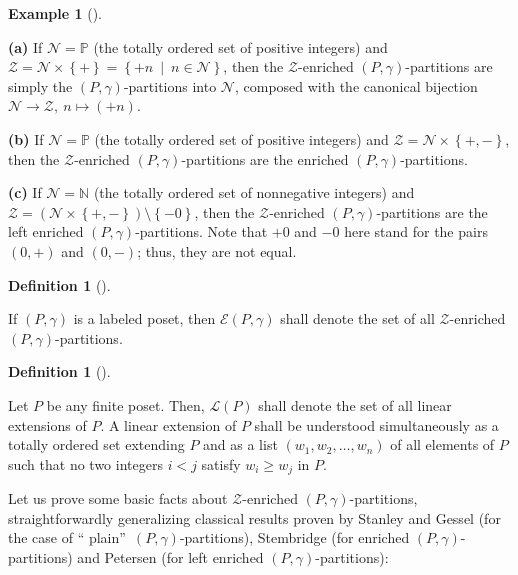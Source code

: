 \documentclass[numbers=enddot,12pt,final,onecolumn,notitlepage]{scrartcl}%
\theoremstyle{definition}
\newtheorem{defi}[theo]{Definition}
\newenvironment{definition}[1][]
{\begin{defi}[#1]\begin{leftbar}}
{\end{leftbar}\end{defi}}
\newtheorem{exmp}[theo]{Example}
\newenvironment{example}[1][]
{\begin{exmp}[#1]\begin{leftbar}}
{\end{leftbar}\end{exmp}}
\begin{document}
\begin{example}
\label{exa.ambivPp.abc}\textbf{(a)} If $\mathcal{N}=\mathbb{P}$ (the totally
ordered set of positive integers) and $\mathcal{Z}=\mathcal{N}\times\left\{
+\right\}  =\left\{  +n\ \mid\ n\in\mathcal{N}\right\}  $, then the
$\mathcal{Z}$-enriched $\left(  P,\gamma\right)  $-partitions are simply the
$\left(  P,\gamma\right)  $-partitions into $\mathcal{N}$, composed with the
canonical bijection $\mathcal{N}\rightarrow\mathcal{Z},\ n\mapsto\left(
+n\right)  $.

\textbf{(b)} If $\mathcal{N}=\mathbb{P}$ (the totally ordered set of positive
integers) and $\mathcal{Z}=\mathcal{N}\times\left\{  +,-\right\}  $, then the
$\mathcal{Z}$-enriched $\left(  P,\gamma\right)  $-partitions are the enriched
$\left(  P,\gamma\right)  $-partitions.

\textbf{(c)} If $\mathcal{N}=\mathbb{N}$ (the totally ordered set of
nonnegative integers) and $\mathcal{Z}=\left(  \mathcal{N}\times\left\{
+,-\right\}  \right)  \setminus\left\{  -0\right\}  $, then the $\mathcal{Z}%
$-enriched $\left(  P,\gamma\right)  $-partitions are the left enriched
$\left(  P,\gamma\right)  $-partitions. Note that $+0$ and $-0$ here stand for
the pairs $\left(  0,+\right)  $ and $\left(  0,-\right)  $; thus, they are
not equal.
\end{example}

\begin{definition}
If $\left(  P,\gamma\right)  $ is a labeled poset, then $\mathcal{E}\left(
P,\gamma\right)  $ shall denote the set of all $\mathcal{Z}$-enriched $\left(
P,\gamma\right)  $-partitions.
\end{definition}

\begin{definition}
Let $P$ be any finite poset. Then, $\mathcal{L}\left(  P\right)  $ shall
denote the set of all linear extensions of $P$. A linear extension of $P$
shall be understood simultaneously as a totally ordered set extending $P$ and
as a list $\left(  w_{1},w_{2},\ldots,w_{n}\right)  $ of all elements of $P$
such that no two integers $i<j$ satisfy $w_{i}\geq w_{j}$ in $P$.
\end{definition}

Let us prove some basic facts about $\mathcal{Z}$-enriched $\left(
P,\gamma\right)  $-partitions, straightforwardly generalizing classical
results proven by Stanley and Gessel (for the case of \textquotedblleft
plain\textquotedblright\ $\left(  P,\gamma\right)  $-partitions), Stembridge
(for enriched $\left(  P,\gamma\right)  $-partitions) and Petersen (for left
enriched $\left(  P,\gamma\right)  $-partitions):
\end{document}
